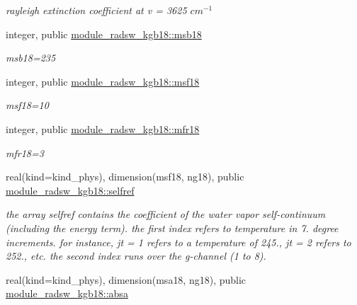 \begin{Indent}
\begin{DoxyCompactItemize}
\begin{DoxyCompactList}\small\item\em rayleigh extinction coefficient at v = 3625 $cm^{-1}$ \end{DoxyCompactList}\item 
integer, public \hyperlink{group__module__radsw__kgbnn_gad2e52d9beb90328236a351926d1a3432}{module\+\_\+radsw\+\_\+kgb18\+::msb18}
\begin{DoxyCompactList}\small\item\em msb18=235 \end{DoxyCompactList}\item 
integer, public \hyperlink{group__module__radsw__kgbnn_ga1d74002f71710887e45df89d3897a10a}{module\+\_\+radsw\+\_\+kgb18\+::msf18}
\begin{DoxyCompactList}\small\item\em msf18=10 \end{DoxyCompactList}\item 
integer, public \hyperlink{group__module__radsw__kgbnn_ga9fa8140413e7ec769baea4f207e58393}{module\+\_\+radsw\+\_\+kgb18\+::mfr18}
\begin{DoxyCompactList}\small\item\em mfr18=3 \end{DoxyCompactList}\item 
real(kind=kind\+\_\+phys), dimension(msf18, ng18), public \hyperlink{group__module__radsw__kgbnn_ga488f807878d909b8f69457b0d7d8ac6a}{module\+\_\+radsw\+\_\+kgb18\+::selfref}
\begin{DoxyCompactList}\small\item\em the array selfref contains the coefficient of the water vapor self-\/continuum (including the energy term). the first index refers to temperature in 7. degree increments. for instance, jt = 1 refers to a temperature of 245., jt = 2 refers to 252., etc. the second index runs over the g-\/channel (1 to 8). \end{DoxyCompactList}\item 
real(kind=kind\+\_\+phys), dimension(msa18, ng18), public \hyperlink{group__module__radsw__kgbnn_ga8a7787776bd057b1815e92a5f58b9cac}{module\+\_\+radsw\+\_\+kgb18\+::absa}

\end{DoxyCompactItemize}
\end{Indent}
